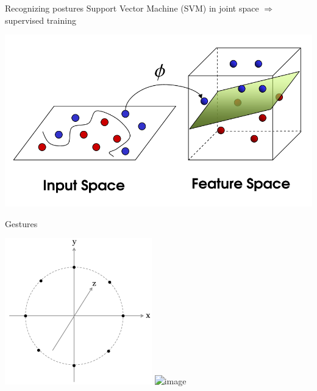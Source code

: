 \documentclass[compress]{beamer}
\begin{document}
\begin{frame}{Recognizing postures}
    \centering
    {\Medium Support Vector Machine} (SVM) in joint space
    $\Rightarrow$ supervised training

    \begin{center}
        \includegraphics[width=0.8\linewidth]{svm}
    \end{center}
\end{frame}


{
\begin{frame}{Gestures}
    \begin{center}
        \includegraphics[width=0.5\linewidth]{gesture-ideal}
        \includegraphics<2>[width=0.5\linewidth]{gesture-real}
    \end{center}
\end{frame}
}
\end{document}

